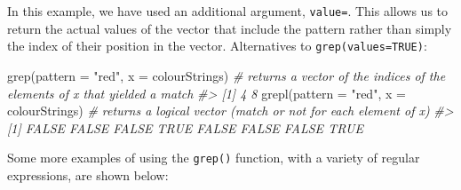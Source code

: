 \documentclass[
]{book}
\newenvironment{Shaded}{\begin{snugshade}}{\end{snugshade}}
\newcommand{\AttributeTok}[1]{\textcolor[rgb]{0.77,0.63,0.00}{#1}}
\newcommand{\CommentTok}[1]{\textcolor[rgb]{0.56,0.35,0.01}{\textit{#1}}}
\newcommand{\ConstantTok}[1]{\textcolor[rgb]{0.00,0.00,0.00}{#1}}
\newcommand{\FunctionTok}[1]{\textcolor[rgb]{0.00,0.00,0.00}{#1}}
\newcommand{\NormalTok}[1]{#1}
\newcommand{\OtherTok}[1]{\textcolor[rgb]{0.56,0.35,0.01}{#1}}
\newcommand{\StringTok}[1]{\textcolor[rgb]{0.31,0.60,0.02}{#1}}
\begin{document}
In this example, we have used an additional argument, \texttt{value=}. This allows us to return the actual values of the vector that include the pattern rather than simply the index of their position in the vector. Alternatives to \texttt{grep(values=TRUE)}:

\begin{Shaded}
\begin{Highlighting}[]
\FunctionTok{grep}\NormalTok{(}\AttributeTok{pattern =} \StringTok{"red"}\NormalTok{, }\AttributeTok{x =}\NormalTok{ colourStrings)  }\CommentTok{\# returns a vector of the indices of the elements of x that yielded a match}
\CommentTok{\#\textgreater{} [1] 4 8}
\FunctionTok{grepl}\NormalTok{(}\AttributeTok{pattern =} \StringTok{"red"}\NormalTok{, }\AttributeTok{x =}\NormalTok{ colourStrings) }\CommentTok{\# returns a logical vector (match or not for each element of x)}
\CommentTok{\#\textgreater{} [1] FALSE FALSE FALSE  TRUE FALSE FALSE FALSE  TRUE}
\end{Highlighting}
\end{Shaded}

Some more examples of using the \texttt{grep()} function, with a variety of regular expressions, are shown below:

\begin{Shaded}
\end{Shaded}
\end{document}
